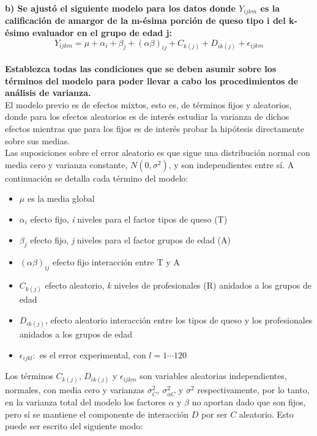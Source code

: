 \documentclass[11pt]{article}
\providecommand{\tightlist}{%
      \setlength{\itemsep}{0pt}\setlength{\parskip}{0pt}}
\begin{document}
    \textbf{b) Se ajustó el siguiente modelo para los datos donde
\(Y_{ijkm}\) es la calificación de amargor de la m-ésima porción de
queso tipo i del k-ésimo evaluador en el grupo de edad j:}\\

\[Y_{ijkm} = \mu + \alpha_i + \beta_j + (\alpha \beta)_{ij} + C_{k(j)} + D_{ik(j)} + \epsilon_{ijkm}\]\\

\textbf{Establezca todas las condiciones que se deben asumir sobre los
términos del modelo para poder llevar a cabo los procedimientos de
análisis de varianza.}\\

    El modelo previo es de efectos mixtos, esto es, de términos fijos y aleatorios, donde para los efectos aleatorios es de interés estudiar la varianza de dichos efectos mientras que para los fijos es de interés probar la hipótesis directamente sobre sus medias.\\

Las suposiciones sobre el error aleatorio es que sigue una distribución
normal con media cero y varianza constante, \(N(0, \sigma^2)\), y son
independientes entre sí. A continuación se detalla cada término del
modelo:

\begin{itemize}
\tightlist
\item 
  \(\mu\) es la media global
\item
  \(\alpha_i\) efecto fijo, \emph{i} niveles para el factor tipos de
  queso (T)
\item
  \(\beta_j\) efecto fijo, \emph{j} niveles para el factor grupos de
  edad (A)
\item
  \((\alpha \beta)_{ij}\) efecto fijo interacción entre T y A
\item
  \(C_{k(j)}\) efecto aleatorio, \emph{k} niveles de profesionales (R)
  anidados a los grupos de edad
\item
  \(D_{ik(j)}\), efecto aleatorio interacción entre los tipos de queso y
  los profesionales anidados a los grupos de edad
\item
  \(\epsilon_{ijkl}:\) es el error experimental, con \(l=1 \cdots 120\)
\end{itemize}

    Los términos \(C_{k(j)}\), \(D_{ik(j)}\) y \(\epsilon_{ijkm}\) son
variables aleatorias independientes, normales, con media cero y varianzas \(\sigma_{C}^2\), \(\sigma_{\alpha C}^2\) y \(\sigma^2\) respectivamente, por lo tanto, en la varianza total del modelo los factores \(\alpha\) y \(\beta\) no aportan dado que son fijos, pero sí se mantiene el componente de interacción \(D\) por ser \(C\) aleatorio. Esto puede ser escrito del siguiente modo:
\end{document}
